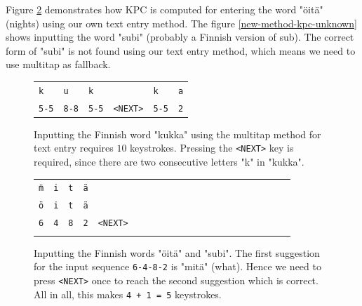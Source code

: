 \documentclass{llncs}
\begin{document}
Figure \ref{new-method-kpc-known} demonstrates how KPC is computed for
entering the word "\"{o}it\"{a}" (nights) using our own text entry
method. The figure \ref{new-method-kpc-unknown} shows inputting the word "subi" (probably a
Finnish version of sub). The correct form of "subi" is not found using our text
entry method, which means we need to use multitap as fallback.

\begin{figure}[htb!]
\begin{center}
\begin{tabular}{llllll}
\texttt{k} & \texttt{u} & \texttt{k} & & \texttt{k} & \texttt{a}
\\ \texttt{5-5} & \texttt{8-8} & \texttt{5-5} & \texttt{<NEXT>} &
\texttt{5-5} & \texttt{2}
\end{tabular}
\caption{Inputting the Finnish word "kukka" using the multitap method
  for text entry requires $10$ keystrokes. Pressing the
  \texttt{<NEXT>} key is required, since there are two consecutive
  letters "k" in "kukka".}\label{kukka-kpc}
\end{center}
\end{figure}

\begin{figure}[htb!]
\begin{center}
\begin{tabular}{lllllllllllllllllllll}
\texttt{\"{m}} & \texttt{i} & \texttt{t} & \texttt{\"{a}} & \\ 
\texttt{\"{o}} & \texttt{i} & \texttt{t} & \texttt{\"{a}} & \\ 
\texttt{6} & \texttt{4} & \texttt{8} & \texttt{2} & \texttt{<NEXT>}\\\\
\end{tabular}
\end{center}
\caption{Inputting the Finnish words "\"{o}it\"{a}" and "subi". The first suggestion for the input sequence \texttt{6-4-8-2} is "mit\"{a}" (what). Hence we need to press \texttt{<NEXT>} once to reach the second suggestion which is correct. All in all, this makes \texttt{4 + 1 = 5} keystrokes.} \label{new-method-kpc-known}
\end{figure}
\end{document}
